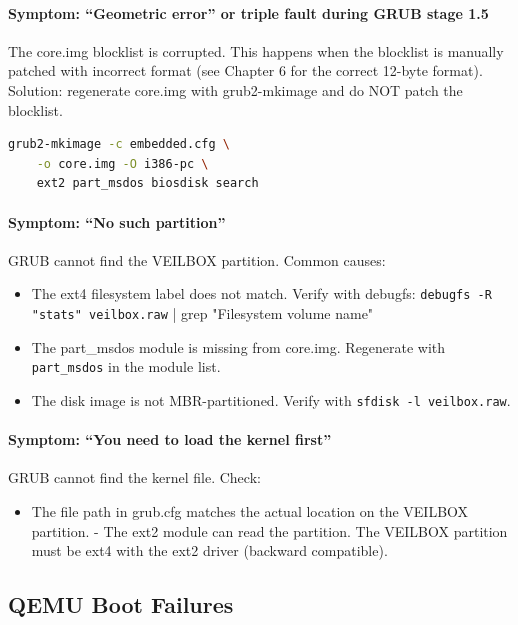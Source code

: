 \paragraph{Symptom: ``Geometric error'' or triple fault during GRUB stage 1.5}

The core.img blocklist is corrupted. This happens when the blocklist
is manually patched with incorrect format (see Chapter 6 for the correct
12-byte format). Solution: regenerate core.img with grub2-mkimage and
do NOT patch the blocklist.

\begin{lstlisting}[language=bash]
grub2-mkimage -c embedded.cfg \
    -o core.img -O i386-pc \
    ext2 part_msdos biosdisk search
\end{lstlisting}

\paragraph{Symptom: ``No such partition''}

GRUB cannot find the VEILBOX partition. Common causes:

\begin{itemize}[nosep]
  \item The ext4 filesystem label does not match. Verify with debugfs:
        \texttt{debugfs -R "stats" veilbox.raw} | grep "Filesystem volume name"
  \item The part\_msdos module is missing from core.img. Regenerate with
        \texttt{part\_msdos} in the module list.
  \item The disk image is not MBR-partitioned. Verify with
        \texttt{sfdisk -l veilbox.raw}.
\end{itemize}

\paragraph{Symptom: ``You need to load the kernel first''}

GRUB cannot find the kernel file. Check:

\begin{itemize}[nosep]
  \item The file path in grub.cfg matches the actual location on the
        VEILBOX partition.
  - The ext2 module can read the partition. The VEILBOX partition must
        be ext4 with the ext2 driver (backward compatible).
\end{itemize}

\subsection{QEMU Boot Failures}

